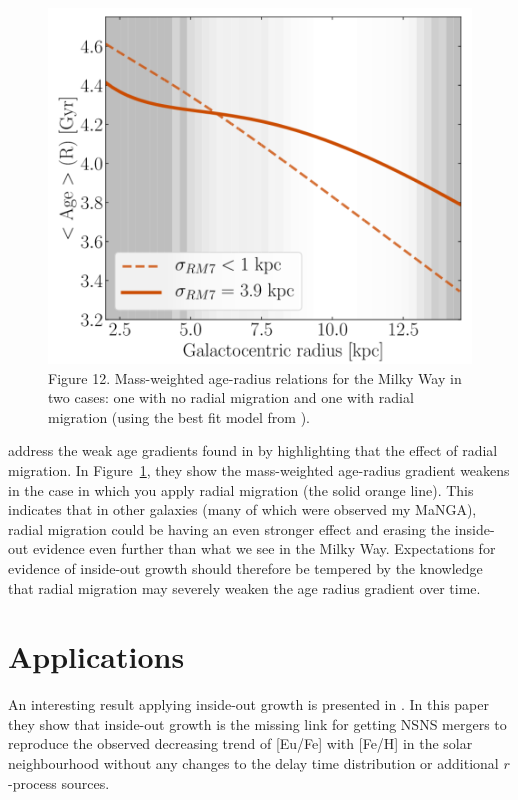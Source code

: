 \documentclass[preprint2]{aastex631}
\begin{document}
\begin{figure}[tb]
    \centering
    \includegraphics[width=\columnwidth]{frankel2019_fig12.png}
    \caption{\citet{Frankel+2019} Figure 12. Mass-weighted age-radius relations for the Milky Way in two cases: one with no radial migration and one with radial migration (using the best fit model from \citet{Frankel+2019}).}
    \label{fig:frankel_gradient}
\end{figure}

\citet{Frankel+2019} address the weak age gradients found in \citet{Goddard+2017} by highlighting that the effect of radial migration. In Figure~\ref{fig:frankel_gradient}, they show the mass-weighted age-radius gradient weakens in the case in which you apply radial migration (the solid orange line). This indicates that in other galaxies (many of which were observed my MaNGA), radial migration could be having an even stronger effect and erasing the inside-out evidence even further than what we see in the Milky Way. Expectations for evidence of inside-out growth should therefore be tempered by the knowledge that radial migration may severely weaken the age radius gradient over time.

\section{Applications}
An interesting result applying inside-out growth is presented in \citet{Banerjee+2020}. In this paper they show that inside-out growth is the missing link for getting NSNS mergers to reproduce the observed decreasing trend of [Eu/Fe] with [Fe/H] in the solar neighbourhood without any changes to the delay time distribution or additional $r$-process sources.
\end{document}
